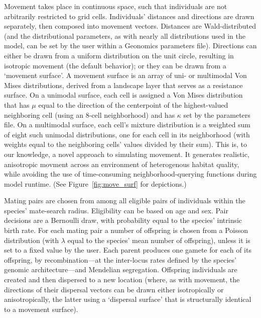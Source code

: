 ﻿\documentclass{article}
\begin{document}
Movement takes place in continuous space, such that individuals are not arbitrarily restricted to grid cells.
Individuals' distances and directions are drawn separately, then composed into movement vectors.
Distances are Wald-distributed (and the distributional parameters, as with nearly all distributions
used in the model, can be set by the user within a Geonomics parameters file).
Directions can either be drawn from a uniform distribution on the unit circle, resulting in isotropic movement
(the default behavior); or they can be drawn from a `movement surface'.
A movement surface is an array of uni- or multimodal Von Mises distributions,
derived from a landscape layer that serves as a resistance surface.
On a unimodal surface, each cell is assigned a Von Mises distribution that has $\mu$
equal to the direction of the centerpoint of the highest-valued neighboring cell
(using an 8-cell neighborhood) and has $\kappa$ set by the parameters file.
On a multimodal surface, each cell's mixture distribution is a weighted sum of eight such
unimodal distributions, one for each cell in its neighborhood
(with weights equal to the neighboring cells' values divided by their sum). 
This is, to our knowledge, a novel approach to simulating movement.
It generates realistic, anisotropic movment across an environment of heterogenous habitat quality, while avoiding the use of time-consuming neighborhood-querying functions during model runtime.
(See Figure~\ref{fig:move_surf} for depictions.)

Mating pairs are chosen from among all eligible pairs of individuals within the species' mate-search radius.
Eligibility can be based on age and sex.
Pair decisions are a Bernoulli draw, with probability equal to the species' intrinsic birth rate.
For each mating pair a number of offspring is chosen from a Poisson distribution (with
$\lambda$ equal to the species' mean number of offspring), unless it is set to a fixed value by the user.
Each parent produces one gamete for each of its offspring, by recombination---at 
the inter-locus rates defined by the species' genomic architecture---and 
Mendelian segregation.
Offspring individuals are created and then dispersed to a new location
(where, as with movement, the directions of their dispersal vectors can be drawn either isotropically or
anisotropically, the latter using a `dispersal surface' that is structurally
identical to a movement surface).
\end{document}
